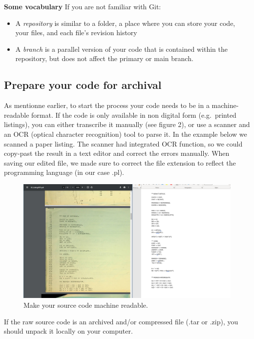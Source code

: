 \documentclass[]{article}
\providecommand{\tightlist}{%
  \setlength{\itemsep}{0pt}\setlength{\parskip}{0pt}}
\begin{document}
\textbf{Some vocabulary} If you are not familiar with Git:

\begin{itemize}
\tightlist
\item
  A \emph{repository} is similar to a folder, a place where you can
  store your code, your files, and each file's revision history
\item
  A \emph{branch} is a parallel version of your code that is contained
  within the repository, but does not affect the primary or main branch.
\end{itemize}

\hypertarget{prepare-your-code-for-archival}{%
\subsection{Prepare your code for
archival}\label{prepare-your-code-for-archival}}

As mentionne earlier, to start the process your code needs to be in a
machine-readable format. If the code is only available in non digital
form (e.g.~printed listings), you can either transcribe it manually (see
figure 2), or use a scanner and an OCR (optical character recognition)
tool to parse it. In the example below we scanned a paper listing. The
scanner had integrated OCR function, so we could copy-past the result in
a text editor and correct the errors manually. When saving our edited
file, we made sure to correct the file extension to reflect the
programming language (in our case .pl).

\begin{figure}
\hypertarget{fig:OCR}{%
\centering
\includegraphics{./media2/09_OCR.PNG}
\caption{Make your source code machine readable.}\label{fig:OCR}
}
\end{figure}

If the raw source code is an archived and/or compressed file (.tar or
.zip), you should unpack it locally on your computer.
\end{document}

